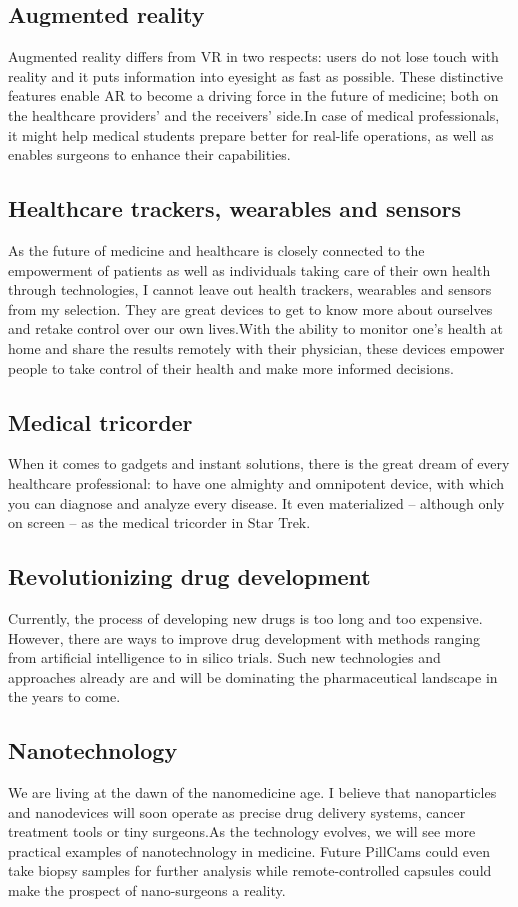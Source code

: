 \documentclass{article}
\begin{document}
\subsection{Augmented reality}
Augmented reality differs from VR in two respects: users do not lose touch with reality and it puts information into eyesight as fast as possible. These distinctive features enable AR to become a driving force in the future of medicine; both on the healthcare providers’ and the receivers’ side.In case of medical professionals, it might help medical students prepare better for real-life operations, as well as enables surgeons to enhance their capabilities.
\subsection{Healthcare trackers, wearables and sensors}
As the future of medicine and healthcare is closely connected to the empowerment of patients as well as individuals taking care of their own health through technologies, I cannot leave out health trackers, wearables and sensors from my selection. They are great devices to get to know more about ourselves and retake control over our own lives.With the ability to monitor one’s health at home and share the results remotely with their physician, these devices empower people to take control of their health and make more informed decisions.
\subsection{Medical tricorder}
When it comes to gadgets and instant solutions, there is the great dream of every healthcare professional: to have one almighty and omnipotent device, with which you can diagnose and analyze every disease. It even materialized – although only on screen – as the medical tricorder in Star Trek. 
\subsection{Revolutionizing drug development}
Currently, the process of developing new drugs is too long and too expensive. However, there are ways to improve drug development with methods ranging from artificial intelligence to in silico trials. Such new technologies and approaches already are and will be dominating the pharmaceutical landscape in the years to come.
\subsection{Nanotechnology}
We are living at the dawn of the nanomedicine age. I believe that nanoparticles and nanodevices will soon operate as precise drug delivery systems, cancer treatment tools or tiny surgeons.As the technology evolves, we will see more practical examples of nanotechnology in medicine. Future PillCams could even take biopsy samples for further analysis while remote-controlled capsules could make the prospect of nano-surgeons a reality.
\end{document}
